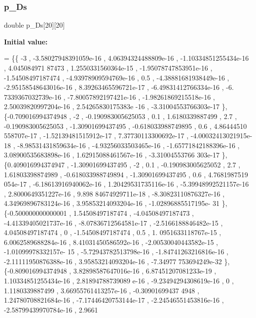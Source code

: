 \subsubsection{\texorpdfstring{p\+\_\+\+Ds}{p\_Ds}}
{\footnotesize\ttfamily double p\+\_\+\+Ds\mbox{[}20\mbox{]}\mbox{[}20\mbox{]}}

{\bfseries Initial value\+:}
\begin{DoxyCode}
= \{\{               -3 , -3.58027948391059e-16 , 4.06394324488809e-16 , -1.10334851255434e-16 ,  4.045084971
      87473 , 1.2550331560364e-15 , -1.95078747853951e-16 , -1.54508497187474 , -4.93978909594769e-16 ,           
          0.5 , -4.38881681938449e-16 , -2.95158548643016e-16 , 8.39263465596721e-17 , -6.49831412766334e-16 , -6.
      7339367032739e-16 , -7.80057892197421e-16 , -1.98261869215518e-16 , 2.50039820997204e-16 , 2.54265830175383e
      -16 , -3.31004553766303e-17 \},
\{-0.709016994374948 ,                -2 , -0.190983005625053 ,               0.1 ,   1.6180339887499 ,     
                2.7 , -0.190983005625053 , -1.30901699437495 , -0.618033988749895 ,               0.6 , 4.86444510
      558707e-17 , -1.52139481515912e-17 , 7.37730113300692e-17 , -4.00032413021915e-18 , -8.98531431859634e-16 , 
      -4.93256033503465e-16 , -1.65771842188396e-16 , 3.08900535683898e-16 , 1.62915088461567e-16 , -3.31004553766
      303e-17 \},
\{0.409016994374947 , -1.30901699437495 ,                -2 ,               0.1 , -0.190983005625052 ,      
               2.7 ,  1.61803398874989 , -0.618033988749894 , -1.30901699437495 ,               0.6 , 4.7681987519
      054e-17 , -6.18613916940062e-16 , 1.20429531735116e-16 , -5.39948992521157e-16 , 2.8000649351227e-16 , 9.898
      84674929711e-18 , -8.30823110876327e-16 , 4.34969896783124e-16 , 3.95853214093204e-16 , -1.02896885517195e-
      31 \},
\{-0.500000000000001 ,  1.54508497187474 , -4.04508497187473 , -4.41339405021737e-16 , -8.07836712564581e-17
       , -2.5166188846482e-15 ,  4.04508497187474 ,                 0 , -1.54508497187474 ,               0.5 , 1.
      0951633118767e-15 , 6.0062589688284e-16 , 8.41031450586592e-16 , -2.00530040443582e-15 , -1.01099978332157e-
      15 , -5.72943782513798e-16 , -1.84741263216816e-16 , -2.11111950876388e-16 , 3.95853214093204e-16 , -7.34977
      753694249e-32 \},
\{-0.809016994374948 , 3.82898587647016e-16 , 6.87451207081233e-19 , 1.10334851255434e-16 , 2.81894788739089
      e-16 , -9.23494294308619e-16 ,                 0 ,   1.1180339887499 , 3.66955761413257e-16 , -0.30901699437
      4948 , 1.24780708821684e-16 , -7.17446420753144e-17 , -2.24546551453816e-16 , -2.58799439970784e-16 , 2.9661

\end{DoxyCode}
